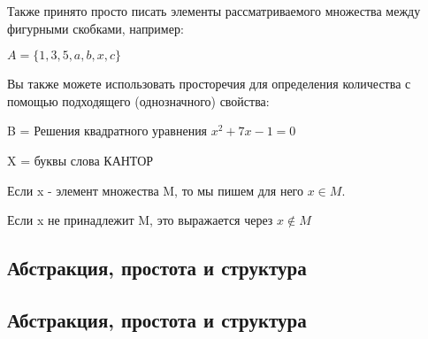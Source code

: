 Также принято просто писать элементы рассматриваемого множества между фигурными скобками, например:

\vspace{0.5cm}
\(A = \{1,3,5,a,b,x,c\}\)
\vspace{0.5cm}

Вы также можете использовать просторечия для определения количества с помощью подходящего (однозначного) свойства:

\vspace{0.5cm}
B = Решения квадратного уравнения \(x^2+7x-1=0\)

X = буквы слова КАНТОР
\vspace{0.5cm}

Если x - элемент множества M, то мы пишем для него \(x \in M\).

Если x не принадлежит M, это выражается через \(x \notin M\)
\vspace{0.5cm}
\subsection{Абстракция, простота и структура}
\subsection{Абстракция, простота и структура}
